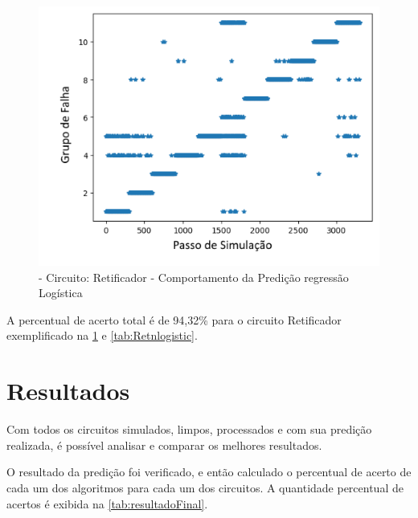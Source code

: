 \begin{itemize}
  \begin{figure}[H]
        \begin{center}
        \includegraphics[width=12.5cm]{./01_Pre_textuais/nonlin_figs/LogisticRegression_Nonlinear_Rectfier_+_4bit_PRBS_[FALHA]_-_300_-_02sraw.png}
        \caption{\label{fig:LogisticRegressionClassifieRet}- Circuito: Retificador - Comportamento da Predição regressão Logística }
        \end{center}
        \end{figure}

A percentual de acerto total é de 94,32\% para o circuito Retificador exemplificado na \ref{fig:LogisticRegressionClassifieRet} e \ref{tab:Retnlogistic}. 
\end{itemize} 



\label{chapter:exemplo}

\section{\textbf{Resultados}}
Com todos os circuitos simulados, limpos, processados e com sua predição realizada, é possível analisar e comparar os melhores resultados. 

O resultado da predição foi verificado, e então calculado o percentual de acerto de cada um dos algoritmos para cada um dos circuitos. A quantidade percentual de acertos é exibida na \ref{tab:resultadoFinal}.

